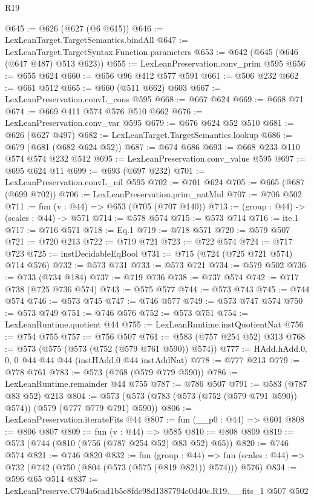 \begin{lexlean}{R19}
\begin{coremodule}
@645 := @626 (@627 (@6 @615))
@646 := LexLeanTarget.TargetSemantics.bindAll
@647 := LexLeanTarget.TargetSyntax.Function.parameters
@653 := @642 (@645 (@646 (@647 @487) @513 @623))
@655 := LexLeanPreservation.conv_prim @595
@656 := @655 @624
@660 := @656 @96 @412 @577 @591
@661 := @506 @232
@662 := @661 @512
@665 := @660 (@511 @662) @603
@667 := LexLeanPreservation.convL_cons @595
@668 := @667 @624
@669 := @668 @71
@674 := @669 @411 @574 @576 @510 @662
@676 := LexLeanPreservation.conv_var @595
@679 := @676 @624 @52 @510
@681 := @626 (@627 @497)
@682 := LexLeanTarget.TargetSemantics.lookup
@686 := @679 (@681 (@682 @624 @52))
@687 := @674 @686
@693 := @668 @233 @110 @574 @574 @232 @512
@695 := LexLeanPreservation.conv_value @595
@697 := @695 @624 @11
@699 := @693 (@697 @232)
@701 := LexLeanPreservation.convL_nil @595
@702 := @701 @624
@705 := @665 (@687 (@699 @702))
@706 := LexLeanPreservation.prim_natMul
@707 := @706 @502
@711 := fun (v : @44) => @653 (@705 (@707 @140))
@713 := (group : @44) -> (scales : @44) -> @571
@714 := @578 @574
@715 := @573 @714
@716 := ite.{1}
@717 := @716 @571
@718 := Eq.{1}
@719 := @718 @571
@720 := @579 @507
@721 := @720 @213
@722 := @719 @721
@723 := @722 @574
@724 := @717 @723
@725 := instDecidableEqBool
@731 := @715 (@724 (@725 @721 @574) @714 @576)
@732 := @573 @731
@733 := @573 @721
@734 := @579 @502
@736 := @733 (@734 @184)
@737 := @719 @736
@738 := @737 @574
@742 := @717 @738 (@725 @736 @574)
@743 := @575 @577
@744 := @573 @743
@745 := @744 @574
@746 := @573 @745
@747 := @746 @577
@749 := @573 @747 @574
@750 := @573 @749
@751 := @746 @576
@752 := @573 @751
@754 := LexLeanRuntime.quotient @44
@755 := LexLeanRuntime.instQuotientNat
@756 := @754 @755
@757 := @756 @507
@761 := @583 (@757 @254 @52) @313
@768 := @573 (@575 (@573 (@752 (@579 @761 @590)) @574))
@777 := HAdd.hAdd.{0, 0, 0} @44 @44 @44 (instHAdd.{0} @44 instAddNat)
@778 := @777 @213
@779 := @778 @761
@783 := @573 (@768 (@579 @779 @590))
@786 := LexLeanRuntime.remainder @44 @755
@787 := @786 @507
@791 := @583 (@787 @83 @52) @213
@804 := @573 (@573 (@783 (@573 (@752 (@579 @791 @590)) @574)) (@579 (@777 @779 @791) @590))
@806 := LexLeanPreservation.iterateFits @44
@807 := fun (__p0 : @44) => @601
@808 := @806 @807
@809 := fun (v : @44) => @585
@810 := @808 @809
@819 := @573 (@744 (@810 (@756 (@787 @254 @52) @83 @52) @65))
@820 := @746 @574
@821 := @746 @820
@832 := fun (group : @44) =>
  fun (scales : @44) => @732 (@742 (@750 (@804 (@573 (@575 (@819 @821)) @574))) @576)
@834 := @596 @65 @514
@837 := LexLeanPreserve.C794a6cad1b5e8fdc98d1387794c0d40c.R19.__fits_1 @507 @502

\end{coremodule}
\end{lexlean}
